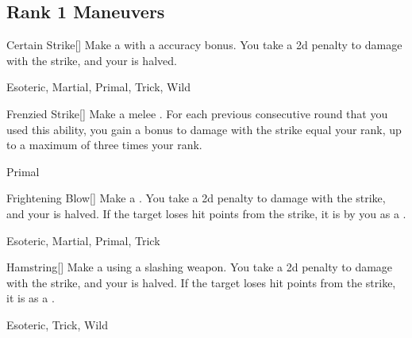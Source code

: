 \subsection{Rank 1 Maneuvers}

\lowercase{\hypertarget{maneuver:Certain Strike}{}}\label{maneuver:Certain Strike}
\hypertarget{maneuver:Certain Strike}{}
\begin{freeability}[Rank 1]{Certain Strike}[]
Make a  with a  accuracy bonus.
You take a \minus2d penalty to damage with the strike, and your  is halved.


 Esoteric, Martial, Primal, Trick, Wild
\end{freeability}
\vspace{0.25em}



\lowercase{\hypertarget{maneuver:Frenzied Strike}{}}\label{maneuver:Frenzied Strike}
\hypertarget{maneuver:Frenzied Strike}{}
\begin{freeability}[Rank 1]{Frenzied Strike}[]
Make a melee .
For each previous consecutive round that you used this ability, you gain a bonus to damage with the strike equal your rank, up to a maximum of three times your rank.


 Primal
\end{freeability}
\vspace{0.25em}



\lowercase{\hypertarget{maneuver:Frightening Blow}{}}\label{maneuver:Frightening Blow}
\hypertarget{maneuver:Frightening Blow}{}
\begin{freeability}[Rank 1]{Frightening Blow}[]
Make a .
You take a \minus2d penalty to damage with the strike, and your  is halved.
If the target loses hit points from the strike, it is  by you as a .


 Esoteric, Martial, Primal, Trick
\end{freeability}
\vspace{0.25em}



\lowercase{\hypertarget{maneuver:Hamstring}{}}\label{maneuver:Hamstring}
\hypertarget{maneuver:Hamstring}{}
\begin{freeability}[Rank 1]{Hamstring}[]
Make a  using a slashing weapon.
You take a \minus2d penalty to damage with the strike, and your  is halved.
If the target loses hit points from the strike, it is  as a .


 Esoteric, Trick, Wild
\end{freeability}
\vspace{0.25em}



